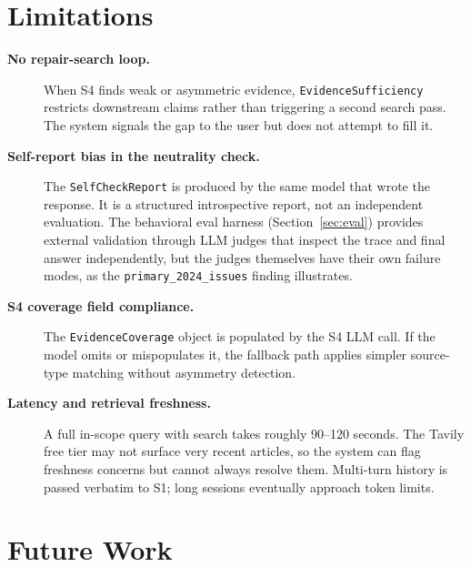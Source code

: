 \documentclass[11pt,letterpaper]{article}
\newcommand{\kw}[1]{\textbf{#1}}
\newcommand{\code}[1]{\texttt{\small #1}}
\begin{document}
\section{Limitations}
\label{sec:limitations}

\begin{description}
  \item[\kw{No repair-search loop.}]
    When S4 finds weak or asymmetric evidence, \code{EvidenceSufficiency}
    restricts downstream claims rather than triggering a second search pass.
    The system signals the gap to the user but does not attempt to fill it.

  \item[\kw{Self-report bias in the neutrality check.}]
    The \code{SelfCheckReport} is produced by the same model that wrote the
    response. It is a structured introspective report, not an independent
    evaluation. The behavioral eval harness (Section~\ref{sec:eval}) provides
    external validation through LLM judges that inspect the trace and final
    answer independently, but the judges themselves have their own failure
    modes, as the \texttt{primary\_2024\_issues} finding illustrates.

  \item[\kw{S4 coverage field compliance.}]
    The \code{EvidenceCoverage} object is populated by the S4 LLM call. If
    the model omits or mispopulates it, the fallback path applies simpler
    source-type matching without asymmetry detection.

  \item[\kw{Latency and retrieval freshness.}]
    A full in-scope query with search takes roughly 90--120 seconds. The
    Tavily free tier may not surface very recent articles, so the system can
    flag freshness concerns but cannot always resolve them. Multi-turn history
    is passed verbatim to S1; long sessions eventually approach token limits.
\end{description}


\section{Future Work}
\label{sec:future}
\end{document}
